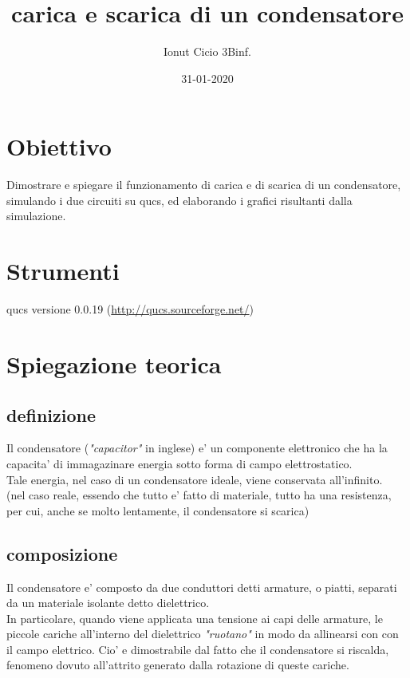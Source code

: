 \documentclass[12pt]{article}
\begin{document}
\title{carica e scarica di un condensatore}
\author{Ionut Cicio 3Binf.}
\date{31-01-2020}

\maketitle

\section*{Obiettivo}
Dimostrare e spiegare il funzionamento di carica e di scarica di un condensatore,
simulando i due circuiti su qucs, ed elaborando i grafici risultanti dalla simulazione.

\section*{Strumenti}
qucs versione 0.0.19 (\url{http://qucs.sourceforge.net/})

\section*{Spiegazione teorica}

\subsection*{definizione}
Il condensatore (\textit{"capacitor"} in inglese) e' un componente elettronico che ha la capacita' di immagazinare energia sotto forma di campo elettrostatico. \\
Tale energia, nel caso di un condensatore ideale, viene conservata all'infinito.\\
(nel caso reale, essendo che tutto e' fatto di materiale, tutto ha una resistenza, per cui, anche se molto lentamente, il condensatore si scarica)

\subsection*{composizione}
Il condensatore e' composto da due conduttori detti armature, o piatti, separati da un materiale isolante detto dielettrico. \\
In particolare, quando viene applicata una tensione ai capi delle armature, le piccole cariche all'interno del dielettrico \textit{"ruotano"} in modo da allinearsi con con il campo elettrico.
Cio' e dimostrabile dal fatto che il condensatore si riscalda, fenomeno dovuto all'attrito generato dalla rotazione di queste cariche. \\
\end{document}
